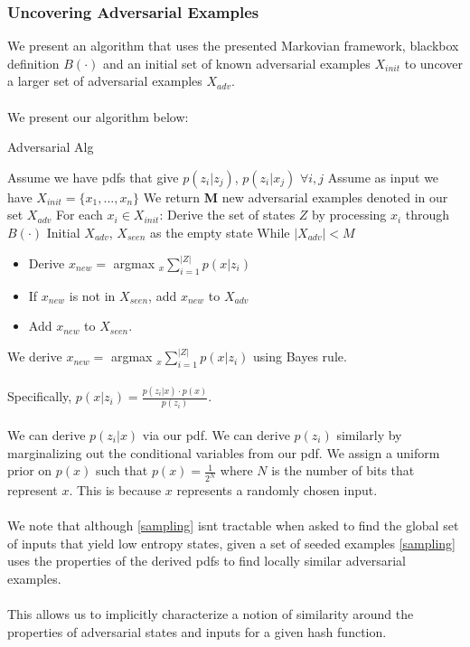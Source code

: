 \subsubsection{Uncovering Adversarial Examples}
We present an algorithm that uses the presented Markovian framework, blackbox definition $B(\cdot)$ and an initial set of known adversarial examples $X_{init}$ to uncover a larger set of adversarial examples $X_{adv}$. 
\\
\\
We present our algorithm below:

\begin{algorithm}
\caption{Adversarial Alg}\label{sampling}
\begin{algorithmic}[1]
\State Assume we have pdfs that give $p(z_{i} | z_{j})$, $p(z_{i} | x_{j})$ $\forall i,j$
\State Assume as input we have $X_{init} = \{x_{1}, ..., x_{n}\}$
\State We return \textbf{M} new adversarial examples denoted in our set $X_{adv}$
\State For each $x_{i} \in X_{init}$:
\State Derive the set of states $Z$ by processing $x_{i}$ through $B(\cdot)$
\State Initial $X_{adv}$, $X_{seen}$ as the empty state
\State While $|X_{adv} | < M$
\begin{itemize}
\item Derive $x_{new} =$ argmax $_{x} \sum_{i=1}^{|Z|} p(x | z_{i})$
\item If $x_{new}$ is not in $X_{seen}$, add $x_{new}$ to $X_{adv}$
\item Add $x_{new}$ to $X_{seen}$.
\end{itemize}
\end{algorithmic}
\end{algorithm}

We derive $x_{new} =$ argmax $_{x} \sum_{i=1}^{|Z|} p(x | z_{i})$ using Bayes rule. 
\\
\\
Specifically, $p(x | z_{i}) = \frac{p(z_{i} | x) \cdot p(x)}{p(z_{i})}$. 
\\
\\
We can derive $p(z_{i} | x)$ via our pdf. We can derive $p(z_{i})$ similarly by marginalizing out the conditional variables from our pdf. We assign a uniform prior on $p(x)$ such that $p(x) = \frac{1}{2^{N}}$ where $N$ is the number of bits that represent $x$. This is because $x$ represents a randomly chosen input.
\\
\\
We note that although \ref{sampling} isnt tractable when asked to find the global set of inputs that yield low entropy states, given a set of seeded examples \ref{sampling} uses the properties of the derived pdfs to find locally similar adversarial examples. 
\\
\\
This allows us to implicitly characterize a notion of similarity around the properties of adversarial states and inputs for a given hash function. 


